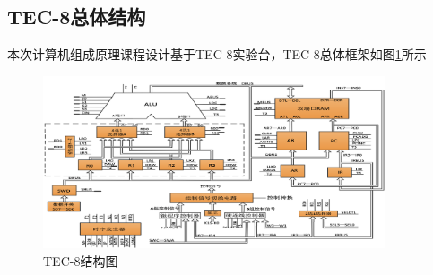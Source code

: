 \subsection{TEC-8总体结构}
本次计算机组成原理课程设计基于TEC-8实验台，TEC-8总体框架如图\ref{fig:construction_of_tec8}所示

\begin{figure}[H]
    \centering
    \label{fig:construction_of_tec8}
    \includegraphics[width=0.9\textwidth]{figures/chapter1/QQ20220828-115423@2x.png}
    \caption{TEC-8结构图}
\end{figure}

